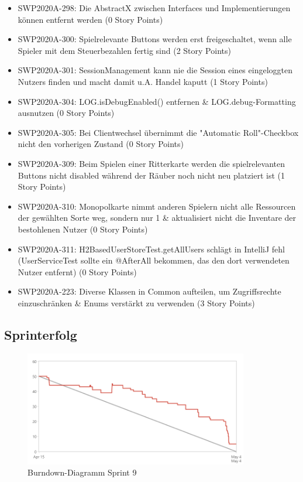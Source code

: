\documentclass[12pt,a4paper, oneside]{article}
\begin{document}
\begin{itemize}
        \item SWP2020A-298:	Die AbstractX zwischen Interfaces und Implementierungen können entfernt werden (0 Story Points)

        \item SWP2020A-300:	Spielrelevante Buttons werden erst freigeschaltet, wenn alle Spieler mit dem Steuerbezahlen fertig sind (2 Story Points)

        \item SWP2020A-301:	SessionManagement kann nie die Session eines eingeloggten Nutzers finden und macht damit u.A. Handel kaputt (1 Story Points)

        \item SWP2020A-304:	LOG.isDebugEnabled() entfernen & LOG.debug-Formatting ausnutzen (0 Story Points)

        \item SWP2020A-305:	Bei Clientwechsel übernimmt die "Automatic Roll"-Checkbox nicht den vorherigen Zustand (0 Story Points)

        \item SWP2020A-309:	Beim Spielen einer Ritterkarte werden die spielrelevanten Buttons nicht disabled während der Räuber noch nicht neu platziert ist (1 Story Points)

        \item SWP2020A-310:	Monopolkarte nimmt anderen Spielern nicht alle Ressourcen der gewählten Sorte weg, sondern nur 1 & aktualisiert nicht die Inventare der bestohlenen Nutzer (0 Story Points)

        \item SWP2020A-311:	H2BasedUserStoreTest.getAllUsers schlägt in IntelliJ fehl (UserServiceTest sollte ein @AfterAll bekommen, das den dort verwendeten Nutzer entfernt) (0 Story Points)

        \item SWP2020A-223:	Diverse Klassen in Common aufteilen, um Zugriffsrechte einzuschränken & Enums verstärkt zu verwenden (3 Story Points)

    \end{itemize}

    \newpage

    \subsection{Sprinterfolg}

        \begin{figure}[h]
            \centering
            \includegraphics[width=\textwidth, height=5cm]{../img/sprint_09/Burndown-Sprint9.PNG}
            \caption{Burndown-Diagramm Sprint 9}
            \label{fig: Burndown-Sprint9}
        \end{figure}
\end{document}
